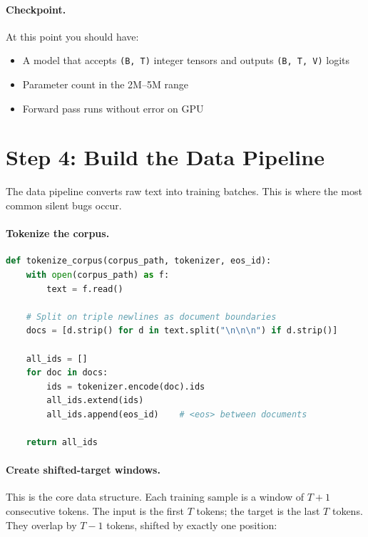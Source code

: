 \paragraph{Checkpoint.}
At this point you should have:
\begin{itemize}[nosep]
  \item A model that accepts \texttt{(B, T)} integer tensors and outputs \texttt{(B, T, V)} logits
  \item Parameter count in the 2M--5M range
  \item Forward pass runs without error on GPU
\end{itemize}


\section{Step 4: Build the Data Pipeline}
\label{sec:guide-data}

The data pipeline converts raw text into training batches.
This is where the most common silent bugs occur.

\paragraph{Tokenize the corpus.}

\begin{lstlisting}[language=python, caption={Tokenize corpus with document boundaries}]
def tokenize_corpus(corpus_path, tokenizer, eos_id):
    with open(corpus_path) as f:
        text = f.read()

    # Split on triple newlines as document boundaries
    docs = [d.strip() for d in text.split("\n\n\n") if d.strip()]

    all_ids = []
    for doc in docs:
        ids = tokenizer.encode(doc).ids
        all_ids.extend(ids)
        all_ids.append(eos_id)    # <eos> between documents

    return all_ids
\end{lstlisting}

\paragraph{Create shifted-target windows.}

This is the core data structure.
Each training sample is a window of $T{+}1$ consecutive tokens.
The input is the first $T$ tokens; the target is the last $T$ tokens.
They overlap by $T{-}1$ tokens, shifted by exactly one position:

